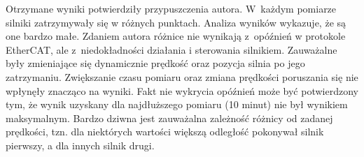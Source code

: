 Otrzymane wyniki potwierdziły przypuszczenia autora. W~każdym pomiarze silniki zatrzymywały się w różnych punktach.
Analiza wyników wykazuje, że są one bardzo małe. Zdaniem autora różnice nie wynikają z~opóźnień w protokole EtherCAT, ale z~niedokładności działania i sterowania silnikiem. Zauważalne były zmieniające się dynamicznie prędkość oraz pozycja silnia po jego zatrzymaniu.
Zwiększanie czasu pomiaru oraz zmiana prędkości poruszania się nie wpłynęły znacząco na wyniki. Fakt nie wykrycia opóźnień może być potwierdzony tym, że wynik uzyskany dla najdłuższego pomiaru (10 minut) nie był wynikiem maksymalnym. Bardzo dziwna jest zauważalna zależność różnicy od zadanej prędkości, tzn. dla niektórych wartości większą odległość pokonywał silnik pierwszy, a dla innych silnik drugi.
%
%
%
%
